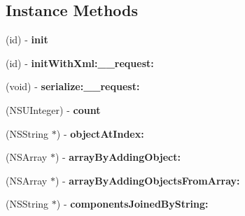 \subsection*{Instance Methods}
\begin{DoxyCompactItemize}
\item 
\hypertarget{interfaceget_logistic_units_for_product_response_aaede95088aaf9814a8fee8efe723dc4b}{}(id) -\/ {\bfseries init}\label{interfaceget_logistic_units_for_product_response_aaede95088aaf9814a8fee8efe723dc4b}

\item 
\hypertarget{interfaceget_logistic_units_for_product_response_ad1f672dd949d471761483754eb190a56}{}(id) -\/ {\bfseries init\+With\+Xml\+:\+\_\+\+\_\+request\+:}\label{interfaceget_logistic_units_for_product_response_ad1f672dd949d471761483754eb190a56}

\item 
\hypertarget{interfaceget_logistic_units_for_product_response_a8cd73549687f8471cd8322f3f222bd52}{}(void) -\/ {\bfseries serialize\+:\+\_\+\+\_\+request\+:}\label{interfaceget_logistic_units_for_product_response_a8cd73549687f8471cd8322f3f222bd52}

\item 
\hypertarget{interfaceget_logistic_units_for_product_response_a475664c2615d187d25ee50cbe3b834d7}{}(N\+S\+U\+Integer) -\/ {\bfseries count}\label{interfaceget_logistic_units_for_product_response_a475664c2615d187d25ee50cbe3b834d7}

\item 
\hypertarget{interfaceget_logistic_units_for_product_response_ae691108f1dc36673310f12425457b0f4}{}(N\+S\+String $\ast$) -\/ {\bfseries object\+At\+Index\+:}\label{interfaceget_logistic_units_for_product_response_ae691108f1dc36673310f12425457b0f4}

\item 
\hypertarget{interfaceget_logistic_units_for_product_response_a387644d560d468f62651a2d563b23582}{}(N\+S\+Array $\ast$) -\/ {\bfseries array\+By\+Adding\+Object\+:}\label{interfaceget_logistic_units_for_product_response_a387644d560d468f62651a2d563b23582}

\item 
\hypertarget{interfaceget_logistic_units_for_product_response_a4e034dfd79fa5526a138871cbabf0426}{}(N\+S\+Array $\ast$) -\/ {\bfseries array\+By\+Adding\+Objects\+From\+Array\+:}\label{interfaceget_logistic_units_for_product_response_a4e034dfd79fa5526a138871cbabf0426}

\item 
\hypertarget{interfaceget_logistic_units_for_product_response_ab1137aa3642db214c6ab6c2913d92709}{}(N\+S\+String $\ast$) -\/ {\bfseries components\+Joined\+By\+String\+:}\label{interfaceget_logistic_units_for_product_response_ab1137aa3642db214c6ab6c2913d92709}


\end{DoxyCompactItemize}
